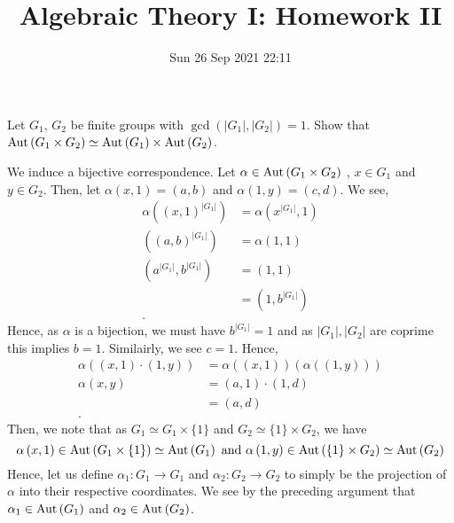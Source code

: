 \documentclass[a4paper]{article}
\title{Algebraic Theory I: Homework II}
\date{Sun 26 Sep 2021 22:11}
\begin{document}
\maketitle
\begin{problem}[1]
	Let \(G_1\), \(G_2\) be finite groups with \(\gcd\left( \left| G_1 \right| , \left| G_2 \right|  \right) = 1\). Show that \(\operatorname{Aut}\left( G_1 \times G_2 \right)  \simeq \operatorname{Aut}\left( G_1 \right) \times \operatorname{Aut}\left( G_2 \right) \).
\end{problem}
\begin{solution}
	We induce a bijective correspondence. Let \(\alpha \in \operatorname{Aut}\left( G_1 \times G_2 \right) \) , \(x \in G_1\) and \(y \in G_2\). Then, let \(\alpha\left( x, 1 \right) = \left( a, b \right) \) and \(\alpha\left( 1, y \right)  = \left( c, d \right) \). We see,
\begin{align*}
	\alpha\left( \left( x, 1 \right) ^{\left| G_1 \right| } \right) &= \alpha\left( x^{\left| G_1 \right| }, 1 \right)  \\
	\left( \left( a, b \right) ^{\left| G_1 \right| } \right) &= \alpha\left( 1, 1 \right)  \\
	\left( a^{\left| G_1 \right| }, b^{\left| G_1 \right| } \right) &= \left( 1, 1 \right)  \\
									      &= \left( 1, b^{\left| G_1 \right| } \right)  \\
.\end{align*}
Hence, as \(\alpha\) is a bijection, we must have \(b^{\left| G_1 \right| } = 1\) and as \(\left| G_1 \right| , \left| G_2 \right|  \) are coprime this implies \( b = 1\). Similairly, we see \(c = 1\). Hence,
\begin{align*}
	\alpha\left( \left( x, 1 \right) \cdot \left( 1, y \right)  \right) &= \alpha\left( \left( x, 1 \right)  \right) \left( \alpha\left( \left( 1, y \right)  \right)  \right)  \\
	\alpha\left(  x, y   \right) &= \left( a, 1 \right) \cdot \left( 1, d \right)  \\
				     &=  \left( a, d \right) \\
.\end{align*}
Then, we note that as \(G_1 \simeq G_1 \times \{1\} \) and \(G_2 \simeq \{1\} \times G_2\), we have \[\alpha\left( x, 1 \right) \in \operatorname{Aut}\left( G_1 \times \{ 1\}  \right) \simeq \operatorname{Aut}\left( G_1 \right) \text{ and  }\alpha\left( 1, y \right) \in \operatorname{Aut}\left( \{1\} \times G_2 \right) \simeq \operatorname{Aut}\left( G_2 \right) \] Hence, let us define \(\alpha_1: G_1 \to G_1\) and \(\alpha_2 : G_2 \to G_2\) to simply be the projection of \(\alpha\) into their respective coordinates. We see by the preceding argument that \(\alpha_1 \in \operatorname{Aut}\left( G_1 \right) \) and \(\alpha_2 \in \operatorname{Aut}\left( G_2 \right) \).\\

\end{solution}
\end{document}
